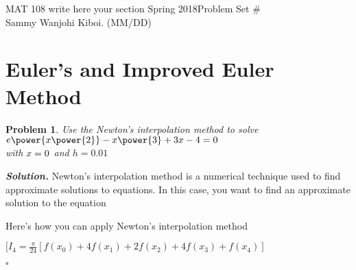 \documentclass[12pt]{article}
\newtheorem{problem}{Problem}
\newenvironment{solution}[1][\it{Solution}]{\textbf{#1. } }{$\square$}
\begin{document}
\noindent MAT 108 write here your section Spring 2018\hfill Problem Set \#\\
Sammy Wanjohi Kiboi. (MM/DD)

\hrulefill

\section{Euler's and Improved Euler Method}
\begin{problem}
Use the Newton's interpolation method to solve \(e\power{x\power{2}}-x\power{3}+3x-4 = 0\) \\ with \(x\index{o}=0\) and \(h = 0.01\) 
\end{problem}
\begin{solution}
Newton's interpolation method is a numerical technique used to find approximate solutions to equations. In this case, you want to find an approximate solution to the equation

Here's how you can apply Newton's interpolation method

\([I_4 = \frac{\pi}{24} \left[f(x_0) + 4f(x_1) + 2f(x_2) + 4f(x_3) + f(x_4)\right]\)

\end{solution} 
\end{document}
